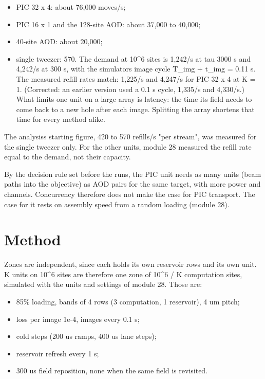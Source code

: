\begin{itemize}
\tightlist
\item
  PIC 32 x 4: about 76,000 moves/s;
\item
  PIC 16 x 1 and the 128-site AOD: about 37,000 to 40,000;
\item
  40-site AOD: about 20,000;
\item
  single tweezer: 570. The demand at 10\^{}6 sites is 1,242/s at tau
  3000 s and 4,242/s at 300 s, with the simulator\textquotesingle s
  image cycle T\_img + t\_img = 0.11 s. The measured refill rates match:
  1,225/s and 4,247/s for PIC 32 x 4 at K = 1. (Corrected: an earlier
  version used a 0.1 s cycle, 1,335/s and 4,330/s.) What limits one unit
  on a large array is latency: the time its field needs to come back to
  a new hole after each image. Splitting the array shortens that time
  for every method alike.
\end{itemize}

The analysis\textquotesingle s starting figure, 420 to 570 refills/s
"per stream", was measured for the single tweezer only. For the other
units, module 28 measured the refill rate equal to the demand, not their
capacity.

By the decision rule set before the runs, the PIC unit needs as many
units (beam paths into the objective) as AOD pairs for the same target,
with more power and channels. Concurrency therefore does not make the
case for PIC transport. The case for it rests on assembly speed from a
random loading (module 28).

\hypertarget{2-method}{%
\section{Method}\label{concurrency-2-method}}

Zones are independent, since each holds its own reservoir rows and its
own unit. K units on 10\^{}6 sites are therefore one zone of 10\^{}6 / K
computation sites, simulated with the units and settings of module 28.
Those are:

\begin{itemize}
\tightlist
\item
  85\% loading, bands of 4 rows (3 computation, 1 reservoir), 4 um
  pitch;
\item
  loss per image 1e-4, images every 0.1 s;
\item
  cold steps (200 us ramps, 400 us lane steps);
\item
  reservoir refresh every 1 s;
\item
  300 us field reposition, none when the same field is revisited.
\end{itemize}

